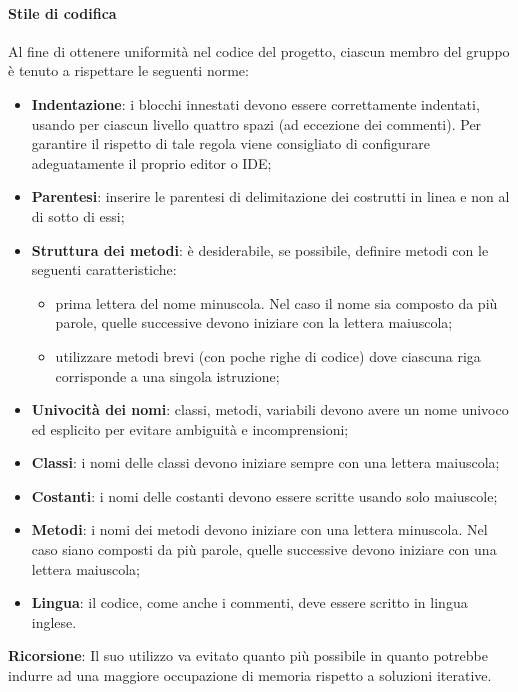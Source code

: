 			\paragraph{Stile di codifica}
				Al fine di ottenere uniformità nel codice del progetto, ciascun membro del gruppo è tenuto a rispettare le seguenti norme:\\
				\begin{itemize}
					\item\textbf{Indentazione}: i blocchi innestati devono essere correttamente indentati, usando per ciascun livello quattro spazi (ad eccezione dei commenti). Per garantire il rispetto di tale regola viene consigliato di configurare adeguatamente il proprio editor o IDE;
					\item\textbf{Parentesi}: inserire le parentesi di delimitazione dei costrutti in linea e non al di sotto di essi;
					\item\textbf{Struttura dei metodi}: è desiderabile, se possibile, definire metodi con le seguenti caratteristiche:
						\begin{itemize}
							\item prima lettera del nome minuscola. Nel caso il nome sia composto da più parole, quelle successive devono iniziare con la lettera maiuscola;
							\item utilizzare metodi brevi (con poche righe di codice) dove ciascuna riga corrisponde a una singola istruzione;
						\end{itemize}
					\item\textbf{Univocità dei nomi}: classi, metodi, variabili devono avere un nome univoco ed esplicito per evitare ambiguità e incomprensioni;
					\item\textbf{Classi}: i nomi delle classi devono iniziare sempre con una lettera maiuscola;
					\item\textbf{Costanti}: i nomi delle costanti devono essere scritte usando solo maiuscole;
					\item\textbf{Metodi}: i nomi dei metodi devono iniziare con una lettera minuscola. Nel caso siano composti da più parole, quelle successive devono iniziare con una lettera maiuscola;
					\item\textbf{Lingua}: il codice, come anche i commenti, deve essere scritto in lingua inglese.			
				\end{itemize}
				\textbf{Ricorsione}: Il suo utilizzo va evitato quanto più possibile in quanto potrebbe indurre ad una maggiore occupazione di memoria rispetto a soluzioni iterative.		
\fi

